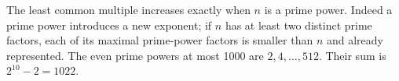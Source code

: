 The least common multiple increases exactly when $n$ is a prime power. Indeed a prime power introduces a new exponent; if $n$ has at least two distinct prime factors, each of its maximal prime-power factors is smaller than $n$ and already represented. The even prime powers at most 1000 are $2,4,\ldots,512$. Their sum is $2^{10}-2=\boxed{1022}$.
